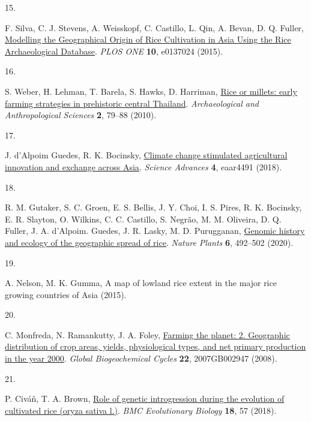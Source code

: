 \documentclass[
  letterpaper,
  DIV=11,
  numbers=noendperiod]{scrartcl}
\newlength{\cslhangindent}
\newlength{\csllabelwidth}
\newenvironment{CSLReferences}[2] %
 {\begin{list}{}{%
  \setlength{\itemindent}{0pt}
  \setlength{\leftmargin}{0pt}
  \setlength{\parsep}{0pt}
  \ifodd #1
   \setlength{\leftmargin}{\cslhangindent}
   \setlength{\itemindent}{-1\cslhangindent}
  \fi
  \setlength{\itemsep}{#2\baselineskip}}}
 {\end{list}}
\newcommand{\CSLLeftMargin}[1]{\parbox[t]{\csllabelwidth}{\strut#1\strut}}
\newcommand{\CSLRightInline}[1]{\parbox[t]{\linewidth - \csllabelwidth}{\strut#1\strut}}
\begin{document}
\begin{CSLReferences}{0}{1}
\CSLLeftMargin{15. }%
\CSLRightInline{F. Silva, C. J. Stevens, A. Weisskopf, C. Castillo, L.
Qin, A. Bevan, D. Q. Fuller,
\href{https://doi.org/10.1371/journal.pone.0137024}{Modelling the
Geographical Origin of Rice Cultivation in Asia Using the Rice
Archaeological Database}. \emph{PLOS ONE} \textbf{10}, e0137024 (2015).}

\CSLLeftMargin{16. }%
\CSLRightInline{S. Weber, H. Lehman, T. Barela, S. Hawks, D. Harriman,
\href{https://doi.org/10.1007/s12520-010-0030-3}{Rice or millets: early
farming strategies in prehistoric central Thailand}.
\emph{Archaeological and Anthropological Sciences} \textbf{2}, 79--88
(2010).}

\CSLLeftMargin{17. }%
\CSLRightInline{J. d'Alpoim Guedes, R. K. Bocinsky,
\href{https://doi.org/10/gfkwf8}{Climate change stimulated agricultural
innovation and exchange across Asia}. \emph{Science Advances}
\textbf{4}, eaar4491 (2018).}

\CSLLeftMargin{18. }%
\CSLRightInline{R. M. Gutaker, S. C. Groen, E. S. Bellis, J. Y. Choi, I.
S. Pires, R. K. Bocinsky, E. R. Slayton, O. Wilkins, C. C. Castillo, S.
Negrão, M. M. Oliveira, D. Q. Fuller, J. A. d'Alpoim. Guedes, J. R.
Lasky, M. D. Purugganan, \href{https://doi.org/10/ggx54g}{Genomic
history and ecology of the geographic spread of rice}. \emph{Nature
Plants} \textbf{6}, 492--502 (2020).}

\CSLLeftMargin{19. }%
\CSLRightInline{A. Nelson, M. K. Gumma, A map of lowland rice extent in
the major rice growing countries of {Asia} (2015).}

\CSLLeftMargin{20. }%
\CSLRightInline{C. Monfreda, N. Ramankutty, J. A. Foley,
\href{https://doi.org/10.1029/2007GB002947}{Farming the planet: 2.
Geographic distribution of crop areas, yields, physiological types, and
net primary production in the year 2000}. \emph{Global Biogeochemical
Cycles} \textbf{22}, 2007GB002947 (2008).}

\CSLLeftMargin{21. }%
\CSLRightInline{P. Civáň, T. A. Brown,
\href{https://doi.org/10.1186/s12862-018-1180-7}{Role of genetic
introgression during the evolution of cultivated rice (oryza sativa
l.)}. \emph{BMC Evolutionary Biology} \textbf{18}, 57 (2018).}


\end{CSLReferences}
\end{document}

